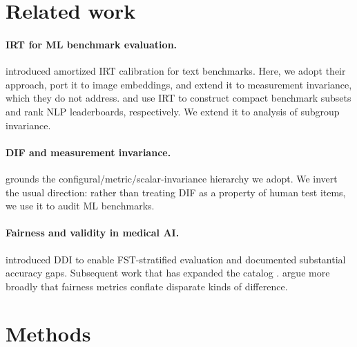 \documentclass{article}
\begin{document}
\section{Related work}
\label{sec:related}

\paragraph{IRT for ML benchmark evaluation.}
\citet{truong2025reliableefficientamortizedmodelbased} introduced amortized IRT calibration for text benchmarks. Here, we adopt their approach, port it to image embeddings, and extend it to measurement invariance, which they do not address. \citet{polo2024tinybenchmarks} and \citet{rodriguez-etal-2021-evaluation} use IRT to construct compact benchmark subsets and rank NLP leaderboards, respectively. We extend it to analysis of subgroup invariance.

\paragraph{DIF and measurement invariance.}
\citet{millsap2011statistical} grounds the configural/metric/scalar-invariance hierarchy we adopt. We invert the usual direction: rather than treating DIF as a property of human test items, we use it to audit ML benchmarks.

\paragraph{Fairness and validity in medical AI.}
\citet{daneshjou2022disparities} introduced DDI to enable FST-stratified evaluation and documented substantial accuracy gaps. Subsequent work that has expanded the catalog \citep{groh2021evaluating}. \citet{wang2025differenceaware} argue more broadly that fairness metrics conflate disparate kinds of difference.
\section{Methods}
\label{sec:methods}
\end{document}
